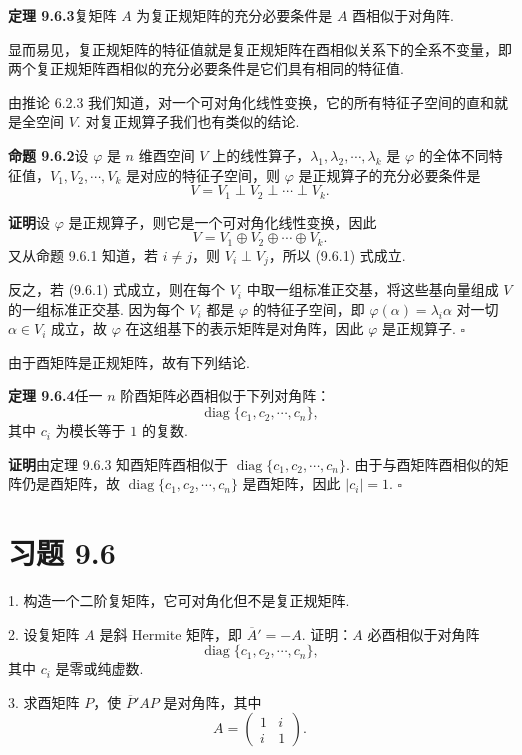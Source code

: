 \documentclass[UTF8, 12pt, fontset=fandol, oneside]{ctexart}
\begin{document}
\noindent\textbf{定理 9.6.3}\quad 复矩阵 $A$ 为复正规矩阵的充分必要条件是 $A$ 酉相似于对角阵.

显而易见，复正规矩阵的特征值就是复正规矩阵在酉相似关系下的全系不变量，即两个复正规矩阵酉相似的充分必要条件是它们具有相同的特征值.

由推论 6.2.3 我们知道，对一个可对角化线性变换，它的所有特征子空间的直和就是全空间 $V$. 对复正规算子我们也有类似的结论.

\noindent\textbf{命题 9.6.2}\quad 设 $\varphi$ 是 $n$ 维酉空间 $V$ 上的线性算子，$\lambda_1,\lambda_2,\cdots,\lambda_k$ 是 $\varphi$ 的全体不同特征值，$V_1,V_2,\cdots,V_k$ 是对应的特征子空间，则 $\varphi$ 是正规算子的充分必要条件是
\begin{equation}
  V=V_1\perp V_2\perp\cdots\perp V_k.
  \tag{9.6.1}
\end{equation}

\noindent\textbf{证明}\quad 设 $\varphi$ 是正规算子，则它是一个可对角化线性变换，因此
\[
  V=V_1\oplus V_2\oplus\cdots\oplus V_k.
\]
又从命题 9.6.1 知道，若 $i\ne j$，则 $V_i\perp V_j$，所以 (9.6.1) 式成立.

反之，若 (9.6.1) 式成立，则在每个 $V_i$ 中取一组标准正交基，将这些基向量组成 $V$ 的一组标准正交基. 因为每个 $V_i$ 都是 $\varphi$ 的特征子空间，即 $\varphi(\alpha)=\lambda_i\alpha$ 对一切 $\alpha\in V_i$ 成立，故 $\varphi$ 在这组基下的表示矩阵是对角阵，因此 $\varphi$ 是正规算子. $\square$

由于酉矩阵是正规矩阵，故有下列结论.

\noindent\textbf{定理 9.6.4}\quad 任一 $n$ 阶酉矩阵必酉相似于下列对角阵：
\[
  \operatorname{diag}\{c_1,c_2,\cdots,c_n\},
\]
其中 $c_i$ 为模长等于 $1$ 的复数.

\noindent\textbf{证明}\quad 由定理 9.6.3 知酉矩阵酉相似于 $\operatorname{diag}\{c_1,c_2,\cdots,c_n\}$. 由于与酉矩阵酉相似的矩阵仍是酉矩阵，故 $\operatorname{diag}\{c_1,c_2,\cdots,c_n\}$ 是酉矩阵，因此 $|c_i|=1$. $\square$

\section*{习题 9.6}

1. 构造一个二阶复矩阵，它可对角化但不是复正规矩阵.

2. 设复矩阵 $A$ 是斜 Hermite 矩阵，即 $\overline A'=-A$. 证明：$A$ 必酉相似于对角阵
\[
  \operatorname{diag}\{c_1,c_2,\cdots,c_n\},
\]
其中 $c_i$ 是零或纯虚数.

3. 求酉矩阵 $P$，使 $\overline P'AP$ 是对角阵，其中
\[
  A=
  \left(\begin{array}{cc}
    1 & i\\
    i & 1
  \end{array}\right).
\]
\end{document}
